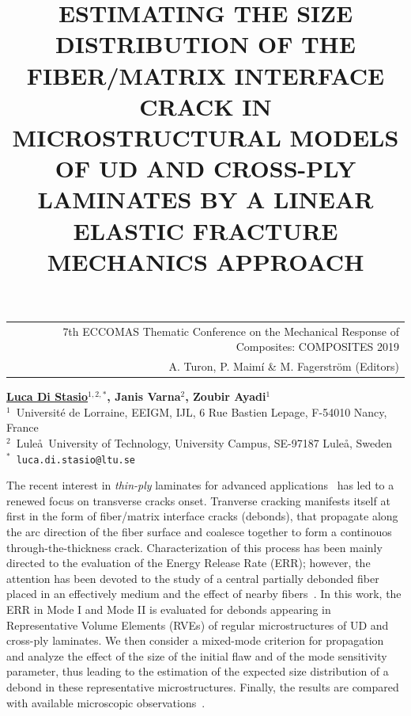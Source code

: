 \documentclass[12pt,a4paper]{article}
\begin{document}
\thispagestyle{empty}

\vspace*{-3.4cm}
\begin{table}[!h]
\begin{tabular}{r}
\hspace*{2.9cm} \scriptsize \textsf{7th ECCOMAS Thematic Conference on the Mechanical Response of Composites: COMPOSITES 2019} \\
\hspace*{2.9cm} \tiny \textsf{A. Turon, P. Maimí \& M. Fagerström (Editors)}
\end{tabular}
\end{table}

\vspace*{-0.7cm}

\begin{center}
\title{ESTIMATING THE SIZE DISTRIBUTION OF THE FIBER/MATRIX INTERFACE CRACK IN MICROSTRUCTURAL MODELS OF UD AND CROSS-PLY LAMINATES BY A LINEAR ELASTIC FRACTURE MECHANICS APPROACH}
\end{center}
\begin{center}
\textbf{\underline{Luca Di Stasio}$^{1,2,*}$, Janis Varna$^{2}$, Zoubir Ayadi$^{1}$} \\ [7pt]
\small{$^1$~Universit\'e de Lorraine, EEIGM, IJL, 6 Rue Bastien Lepage, F-54010 Nancy, France}  \\  [2pt]
\small{$^2$~Lule\aa\ University of Technology, University Campus, SE-97187 Lule\aa, Sweden}  \\  [2pt]
\small{$^*$~\texttt{luca.di.stasio@ltu.se}} \\
\end{center}

\noindent
The recent interest in \emph{thin-ply} laminates for advanced applications~\cite{Kopp2017} has led to a renewed focus on transverse cracks onset. Tranverse cracking manifests itself at first in the form of fiber/matrix interface cracks (debonds), that propagate along the arc direction of the fiber surface and coalesce together to form a continouos through-the-thickness crack. Characterization of this process has been mainly directed to the evaluation of the Energy Release Rate (ERR); however, the attention has been devoted to the study of a central partially debonded fiber placed in an effectively medium and the effect of nearby fibers~\cite{Sandino2016}. In this work, the ERR in Mode I and Mode II is evaluated for debonds appearing in Representative Volume Elements (RVEs) of regular microstructures of UD and cross-ply laminates. We then consider a mixed-mode criterion for propagation and analyze the effect of the size of the initial flaw and of the mode sensitivity parameter, thus leading to the estimation of the expected size distribution of a debond in these representative microstructures. Finally, the results are compared with available microscopic observations~\cite{Correa2018}.
\end{document}
